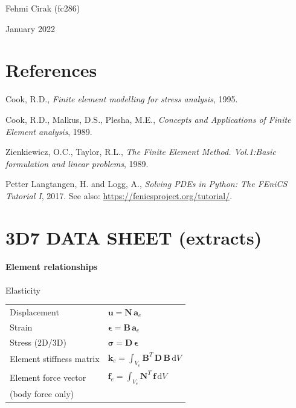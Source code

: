 \documentclass[11pt,a4paper]{article}
\begin{document}
Fehmi Cirak (fc286)


January 2022


\section*{References}
\begin{trivlist}
	\item Cook, R.D., \emph{Finite element modelling for stress analysis}, 1995.   
	\item Cook, R.D., Malkus, D.S., Plesha, M.E., \emph{Concepts and Applications of Finite Element analysis}, 1989.
	\item Zienkiewicz, O.C., Taylor, R.L., \emph{The Finite Element Method. Vol.1:Basic formulation and linear problems}, 1989.
	\item   Petter Langtangen, H. and Logg, A., \emph{Solving PDEs in Python: The FEniCS Tutorial I}, 2017. See also: \href{https://fenicsproject.org/tutorial/}{https://fenicsproject.org/tutorial/}.
\end{trivlist}


\appendix

\section{\textbf{3D7 DATA SHEET (extracts)}}

\paragraph{Element relationships}  \hfill \newline
Elasticity \\
\begin{tabular}{ll}
	Displacement              &$\mathbf{u}       = \mathbf{N}\, \mathbf{a}_{e}$ \\
	Strain                    &$\mathbf{\epsilon}    = \mathbf{B} \,\mathbf{a}_{e}$ \\
	Stress (2D/3D)            &$\mathbf{\sigma}  = \mathbf{D} \,\mathbf{\epsilon}$ \\
	Element stiffness matrix  &$\mathbf{k}_{e}   = \int_{V_{e}} \mathbf{B}^{T} \,\mathbf{D} \,\mathbf{B} \,\mathrm{d} V$ \\
	Element force vector      &$\mathbf{f}_{e}   = \int_{V_{e}} \mathbf{N}^{T}\, \mathbf{f}\,\mathrm{d} V$ \\
	(body force only)         &
\end{tabular}
\end{document}
